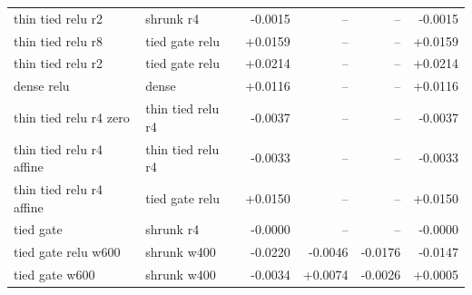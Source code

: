 \begin{tabular}{llrrrr}
thin tied relu r2 & shrunk r4 & -0.0015 & -- & -- & -0.0015 \\
thin tied relu r8 & tied gate relu & +0.0159 & -- & -- & +0.0159 \\
thin tied relu r2 & tied gate relu & +0.0214 & -- & -- & +0.0214 \\
dense relu & dense & +0.0116 & -- & -- & +0.0116 \\
thin tied relu r4 zero & thin tied relu r4 & -0.0037 & -- & -- & -0.0037 \\
thin tied relu r4 affine & thin tied relu r4 & -0.0033 & -- & -- & -0.0033 \\
thin tied relu r4 affine & tied gate relu & +0.0150 & -- & -- & +0.0150 \\
tied gate & shrunk r4 & -0.0000 & -- & -- & -0.0000 \\
tied gate relu w600 & shrunk w400 & -0.0220 & -0.0046 & -0.0176 & -0.0147 \\
tied gate w600 & shrunk w400 & -0.0034 & +0.0074 & -0.0026 & +0.0005 \\
\bottomrule
\end{tabular}
